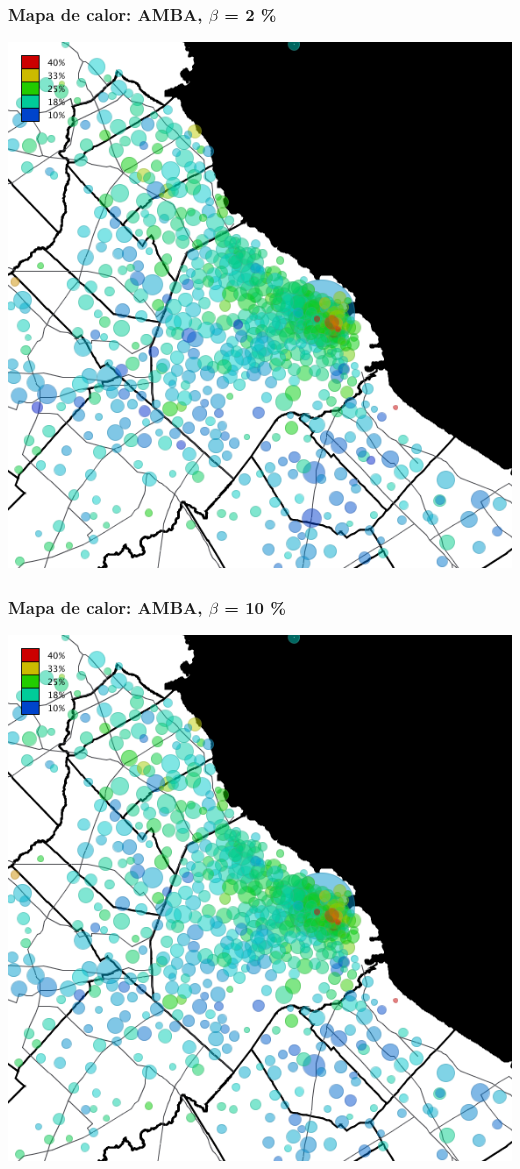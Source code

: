 \documentclass{beamer}
\begin{document}
\begin{frame}
	\frametitle{Mapa de calor: AMBA, $\beta$ = 2 \%}
	\centering
	\includegraphics[height=.9\textheight,width = .9\columnwidth,keepaspectratio]
	{slides/201112_hi_res_amba_usuarios_proporcion_circulos_beta2.png}
\end{frame}
\begin{frame}
	\frametitle{Mapa de calor: AMBA, $\beta$ = 10 \%}
	\centering
	\includegraphics[height=.9\textheight,width = .9\columnwidth,keepaspectratio]
	{slides/201112_hi_res_amba_usuarios_proporcion_circulos_beta10.png}
\end{frame}
\end{document}
